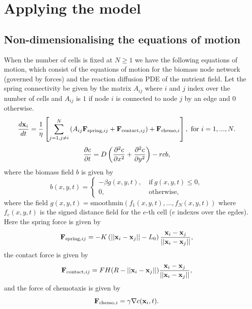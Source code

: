 
\chapter{Applying the model}
\section{Non-dimensionalising the equations of motion}
When the number of cells is fixed at $N \geq 1$ we have the following equations of motion,
which consist of the equations of motion for the biomass node network (governed by forces) and 
the reaction diffusion PDE of the nutrient field. Let the spring connectivity
be given by the matrix $A_{ij}$ where $i$ and $j$ index over the number of cells and $A_{ij}$
is $1$ if node $i$ is connected to node $j$ by an edge and $0$ otherwise.
\begin{equation*}
    \frac{d \vb{x}_i }{dt} = 
    \frac{1}{\eta} \left[\sum_{j = 1, j \neq i}^N   \left(A_{ij} \vb{F}_{\textrm{spring},ij} + 
     \vb{F}_{\textrm{contact},ij} \right) +\vb{F}_{\textrm{chemo},i}  \right] ,
    \ \textrm{for} \ i = 1, ... , N.
\end{equation*}
\begin{equation*}
    \pdv{c}{t} = D \left(\pdv[2]{c}{x} + \pdv[2]{c}{y} \right) - r c b,
\end{equation*}
where the biomass field $b$ is given by 
\begin{equation*}
b(x,y,t) = \begin{cases}
            -\beta g(x,y,t), & \ \textrm{if} \ g(x,y,t) \leq 0, \\
                0, &    \ \textrm{otherwise},
           \end{cases}
\end{equation*}
where the field $g(x,y,t) =\textrm{smoothmin}(f_1(x,y,t), ...,f_N(x,y,t) )$ where 
$f_e(x,y,t)$ is the signed distance field for the $e$-th cell ($e$ indexes over the egdes).
Here the spring force is given by 
\begin{equation}
    \vb{F}_{\textrm{spring},ij} = -K\left( ||\vb{x}_i - \vb{x}_j|| - L_0\right) \frac{\vb{x}_i - \vb{x}_j}{||\vb{x}_i - \vb{x}_j||},
\end{equation}
the contact force is given by 
\begin{equation}
    \vb{F}_{\textrm{contact},ij} = F H(R - ||\vb{x}_i - \vb{x}_j||) \frac{\vb{x}_i - \vb{x}_j}{||\vb{x}_i - \vb{x}_j||} ,
\end{equation}
and the force of chemotaxis is given by 
\begin{equation*}
    \vb{F}_{\textrm{chemo},i} = \gamma \nabla c (\vb{x}_i, t).
\end{equation*}
